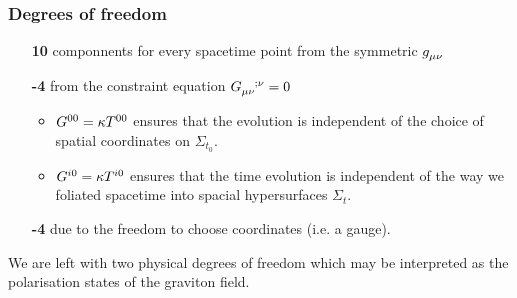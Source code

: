 \subsubsection{Degrees of freedom}
\begin{itemize}
  \item[\color{section_color}\textsf{\textbf{10}}]
  componnents for every spacetime point from the symmetric $\tensor{g}{_\mu_\nu}$
  \item[\color{section_color}\textsf{\textbf{-4}}] from the
  constraint equation $\tensor{G}{_\mu_\nu^{;\nu}}=0$
  \begin{itemize}
    \item
    $\tensor{G}{^0^0}=\kappa \tensor{T}{^0^0}$ ensures that the
    evolution is independent of the choice of spatial coordinates on
    $\Sigma_{t_0}$.
    \item
    $\tensor{G}{^i^0}=\kappa \tensor{T}{^i^0}$ ensures that the time
    evolution is independent of the way we foliated spacetime into spacial
    hypersurfaces $\Sigma_{t}.    $
  \end{itemize}
  \item[\color{section_color}\textsf{\textbf{-4}}] due to the freedom
  to choose coordinates (i.e. a gauge).
\end{itemize}
We are left with two physical degrees of freedom which may be interpreted as the
polarisation states of the graviton field.
